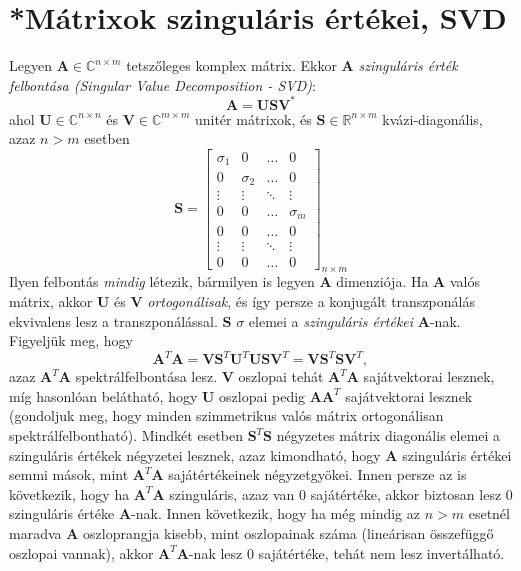 \documentclass[14p]{report}
\def\pmb{\boldsymbol}
\newcounter{x}
\newcounter{y}
\newcounter{z}
\begin{document}
	\section{*Mátrixok szinguláris értékei, SVD}
	Legyen $\pmb{A} \in \mathbb{C}^{n \times m}$ tetszőleges komplex mátrix. Ekkor $\pmb{A}$ \emph{szinguláris érték felbontása (Singular Value Decomposition - SVD)}:
	\[
		\pmb{A} = \pmb{U}\pmb{S}\pmb{V}^*
	\]
	ahol $\pmb{U} \in \mathbb{C}^{n \times n}$ és $\pmb{V} \in \mathbb{C}^{m \times m}$ unitér mátrixok, és $\pmb{S} \in \mathbb{R}^{n \times m}$ kvázi-diagonális, azaz $n > m$ esetben
	\[
		\pmb{S} =
		\begin{bmatrix}
		\sigma_1 & 0 & \dots & 0 \\
		0 & \sigma_2 & \dots & 0 \\
		\vdots & \vdots & \ddots & \vdots \\
		0 & 0 & \dots & \sigma_m \\
		0 & 0 & \dots & 0 \\
		\vdots & \vdots & \ddots & \vdots \\
		0 & 0 & \dots & 0
		\end{bmatrix}_{n \times m}
	\]
	Ilyen felbontás \emph{mindig} létezik, bármilyen is legyen $\pmb{A}$ dimenziója. Ha $\pmb{A}$ valós mátrix, akkor $\pmb{U}$ és $\pmb{V}$ \emph{ortogonálisak}, és így persze a konjugált transzponálás ekvivalens lesz a transzponálással. $\pmb{S}$ $\sigma$ elemei a \emph{szinguláris értékei} $\pmb{A}$-nak. Figyeljük meg, hogy
	\[
		\pmb{A}^T\pmb{A} = \pmb{V}\pmb{S}^T\pmb{U}^T\pmb{U}\pmb{S}\pmb{V}^T = \pmb{V}\pmb{S}^T\pmb{S}\pmb{V}^T,
	\]
	azaz $\pmb{A}^T\pmb{A}$ spektrálfelbontása lesz. $\pmb{V}$ oszlopai tehát $\pmb{A}^T\pmb{A}$ sajátvektorai lesznek, míg hasonlóan belátható, hogy $\pmb{U}$ oszlopai pedig $\pmb{A}\pmb{A}^T$ sajátvektorai lesznek (gondoljuk meg, hogy minden szimmetrikus valós mátrix ortogonálisan spektrálfelbontható). Mindkét esetben $\pmb{S}^T\pmb{S}$ négyzetes mátrix diagonális elemei a szinguláris értékek négyzetei lesznek, azaz kimondható, hogy $\pmb{A}$ szinguláris értékei semmi mások, mint $\pmb{A}^T\pmb{A}$ sajátértékeinek négyzetgyökei. Innen persze az is következik, hogy ha $\pmb{A}^T\pmb{A}$ szinguláris, azaz van $0$ sajátértéke, akkor biztosan lesz $0$ szinguláris értéke $\pmb{A}$-nak. Innen következik, hogy ha még mindig az $n > m$ esetnél maradva $\pmb{A}$ oszloprangja kisebb, mint oszlopainak száma (lineárisan összefüggő oszlopai vannak), akkor $\pmb{A}^T\pmb{A}$-nak lesz $0$ sajátértéke, tehát nem lesz invertálható.
	\\
\end{document}
